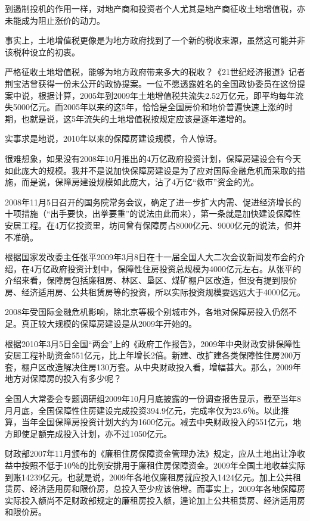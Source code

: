 到遏制投机的作用一样，对地产商和投资者个人尤其是地产商征收土地增值税，亦未能成为阻止涨价的动力。

事实上，土地增值税更像是为地方政府找到了一个新的税收来源，虽然这可能并非该税种设立的初衷。

严格征收土地增值税，能够为地方政府带来多大的税收？《21世纪经济报道》记者荆宝洁曾获得一份未公开的政协提案。一位不愿透露姓名的全国政协委员在这份提案中说，根据计算，2005年到2009年土地增值税共流失2.52万亿元，即平均每年流失5000亿元。而2005年以来的这5年，恰恰是全国房价和地价普遍快速上涨的时期，也就是说，这5年流失的土地增值税按规定应该是逐年递增的。

实事求是地说，2010年以来的保障房建设规模，令人惊讶。

很难想象，如果没有2008年10月推出的4万亿政府投资计划，保障房建设会有今天如此庞大的规模。我并不是说加快保障房建设是为了应对国际金融危机而采取的措施，而是说，保障房建设规模如此庞大，沾了4万亿“救市”资金的光。

2008年11月5日召开的国务院常务会议，确定了进一步扩大内需、促进经济增长的十项措施（“出手要快，出拳要重”的说法由此而来），第一条就是加快建设保障性安居工程。在4万亿投资里，坊间曾有保障房占8000亿元、9000亿元的说法，但并不准确。

根据国家发改委主任张平2009年3月8日在十一届全国人大二次会议新闻发布会的介绍，在4万亿政府投资计划中，保障性住房投资总规模为4000亿元左右。从张平的介绍来看，保障房包括廉租房、林区、垦区、煤矿棚户区改造，但没有提到限价房、经济适用房、公共租赁房等的投资，所以实际投资规模要远远大于4000亿元。

2008年受国际金融危机影响，除北京等极个别城市外，各地对保障房投入仍然不足。真正较大规模的保障房建设是从2009年开始的。

根据2010年3月5日全国“两会”上的《政府工作报告》，2009年中央财政安排保障性安居工程补助资金551亿元，比上年增长2倍。新建、改扩建各类保障性住房200万套，棚户区改造解决住房130万套。从中央财政投入看，增幅甚大。那么，2009年地方对保障房的投入有多少呢？

全国人大常委会专题调研组2009年10月月底披露的一份调查报告显示，截至当年8月月底，全国保障性住房建设完成投资394.9亿元，完成率仅为23.6％。以此推算，当年全国保障房投资计划大约为1600亿元。减去中央财政投入的551亿元，地方即使足额完成投入计划，亦不过1050亿元。

财政部2007年11月颁布的《廉租住房保障资金管理办法》规定，应从土地出让净收益中按照不低于10％的比例安排用于廉租住房保障资金。2009年全国土地收益实际到账14239亿元。也就是说，2009年各地仅廉租房就应投入1424亿元。加上公共租赁房、经济适用房和限价房，总投入至少应该倍增。而事实上，2009年各地保障房实际投入额尚不足财政部规定的廉租房投入额，遑论加上公共租赁房、经济适用房和限价房。

